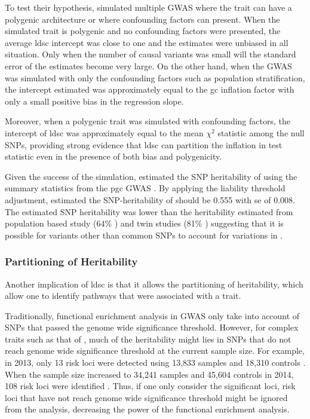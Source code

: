 	To test their hypothesis, \citet{Bulik-Sullivan2015} simulated multiple \gls{GWAS} where the trait can have a polygenic architecture or where confounding factors can present.
	When the simulated trait is polygenic and no confounding factors were presented, the average \gls{ldsc} intercept was close to one and the estimates were unbiased in all situation.
	Only when the number of causal variants was small will the standard error of the estimates become very large.
	On the other hand, when the \gls{GWAS} was simulated with only the confounding factors such as population stratification, the intercept estimated was approximately equal to the \gls{gc} inflation factor with only a small positive bias in the regression slope.
	
	Moreover, when a polygenic trait was simulated with confounding factors, the intercept of \gls{ldsc} was approximately equal to the mean $\chi^2$ statistic among the null \glspl{SNP}, providing strong evidence that \gls{ldsc} can partition the inflation in test statistic even in the presence of both bias and polygenicity.
	
	Given  the success of the simulation, \citet{Bulik-Sullivan2015} estimated the \gls{SNP} heritability of  using the summary statistics from the \gls{pgc}  \gls{GWAS} \citep{Ripke2014}.
	By applying the liability threshold adjustment, \citet{Bulik-Sullivan2015} estimated the \gls{SNP}-heritability of  should be 0.555 with \gls{se} of 0.008.
	The estimated \gls{SNP} heritability was lower than the heritability estimated from population based study (64\% \citep{Lichtenstein2009}) and twin studies (81\% \citep{Sullivan2003}) suggesting that it is possible for variants other than common \glspl{SNP} to account for variations in .
	
	\subsubsection{Partitioning of Heritability}
	Another implication of \gls{ldsc} is that it allows the partitioning of heritability, which allow one to identify pathways that were associated with a trait.
	
	Traditionally, functional enrichment analysis in \gls{GWAS} only take into account of \glspl{SNP} that passed the genome wide significance threshold. 
	However, for complex traits such as that of , much of the heritability might lies in \glspl{SNP} that do not reach genome wide significance threshold at the current sample size.
	For example, in 2013, only 13 risk loci were detected using 13,833  samples and 18,310 controls \citep{Ripke2013}. 
	When the sample size increased to 34,241  samples and 45,604 controls in 2014, 108 risk loci were identified \citep{Ripke2014}. 
	Thus, if one only consider the significant loci, risk loci that have not reach genome wide significance threshold might be ignored from the analysis, decreasing the power of the functional enrichment analysis.

